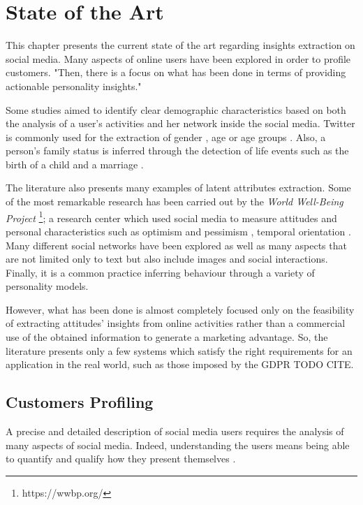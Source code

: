 \chapter{State of the Art}
This chapter presents the current state of the art regarding insights extraction on social media.
Many aspects of online users have been explored in order to profile customers.
"Then, there is a focus on what has been done in terms of providing actionable personality insights."

Some studies aimed to identify clear demographic characteristics based on both the analysis of a user's activities and her network inside the social media. 
Twitter is commonly used for the extraction of gender \cite{miller2012gender}, age or age groups \cite{culotta2015predicting}.
Also, a person's family status is inferred through the detection of life events such as the birth of a child and a marriage \cite{dickinson2015identifying}.


The literature also presents many examples of latent attributes extraction.
Some of the most remarkable research has been carried out by the \emph{World Well-Being Project} \footnote{https://wwbp.org/}; a research center which used 
social media to measure attitudes and personal characteristics such as optimism and pessimism \cite{ruan2016finding}, temporal orientation \cite{schwartz2015extracting}.
Many different social networks have been explored as well as many aspects that are not limited only to text but also include images and social interactions.
Finally, it is a common practice inferring behaviour through a variety of personality models.

However, what has been done is almost completely focused only on the feasibility of extracting attitudes' insights from online activities rather than a commercial use of the obtained information to generate a marketing advantage.
So, the literature presents only a few systems which satisfy the right requirements for an application in the real world, such as those imposed by the GDPR TODO CITE.

\section{Customers Profiling}
A precise and detailed description of social media users requires the analysis of many aspects of social media. 
Indeed, understanding the users means being able to quantify and qualify how they present themselves \cite{schwartz2013personality}.

